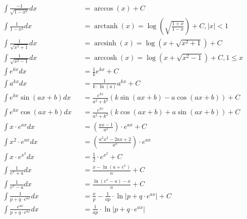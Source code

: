 \begin{footnotesize}
\begin{align*}
         & \int \frac{-1}{\sqrt{1-x^2}}dx        &  & =\arccos(x)+C                                                                     \\
         & \int \frac{1}{1-x^2}dx                &  & =\operatorname{arctanh}(x)=\log(\sqrt{\frac{1+x}{1-x}})+C, \vert x \vert < 1                      \\
         & \int \frac{1}{\sqrt{x^2+1}}dx         &  & =\operatorname{arcsinh}(x)=\log(x+\sqrt{x^2+1})+C                                                 \\
         & \int \frac{1}{\sqrt{x^2-1}}dx         &  & =\operatorname{arccosh}(x)=\log(x+\sqrt{x^2-1})+C, 1 \leq x                                       \\
         & \int e^{kx}dx                         &  & =\frac{1}{k}e^{kx}+C                                                              \\
         & \int a^{kx}dx                         &  & =\frac{1}{k\cdot \ln(a)}a^{kx}+C                                                  \\
         & \int e^{kx}\sin(ax+b)dx               &  & =\frac{e^{kx}}{a^2+k^2}\left(k\sin(ax+b)-a\cos(ax+b)\right)+C                     \\
         & \int e^{kx}\cos(ax+b)dx               &  & =\frac{e^{kx}}{a^2+k^2}\left(k\cos(ax+b)+a\sin(ax+b)\right)+C                     \\
         & \int x \cdot e^{ax}dx                 &  & =(\frac{ax-1}{a^2})\cdot e^{ax}+C                                                 \\
         & \int x^2 \cdot e^{ax}dx               &  & =(\frac{a^2x^2-2ax+2}{a^3})\cdot e^{ax}                                           \\
         & \int x\cdot e^{x^2}dx                 &  & =\frac{1}{2}\cdot e^{x^2}+C                                                       \\
         & \int \frac{1}{e^x+a}dx                &  & =\frac{x-\ln(a+e^x)}{a}+C                                                         \\
         & \int \frac{1}{e^x-a}dx                &  & =\frac{\ln(e^x-a)-x}{a}+C                                                         \\
         & \int \frac{1}{p+q\cdot e^{ax}}dx      &  & =\frac{x}{p}-\frac{1}{ap}\cdot \ln\vert p+q\cdot e^{ax}\vert+C                    \\
         & \int \frac{e^{ax}}{p+q\cdot e^{ax}}dx &  & =\frac{1}{ap}\cdot \ln\vert p+q\cdot e^{ax}\vert                                  \\

\end{align*}
\end{footnotesize}
